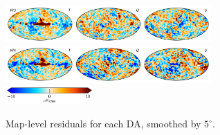\documentclass[twocolumn]{../../common/aa}
\newcommand{\BP}{\textsc{BeyondPlanck}}
\begin{document}
\begin{figure}
	\includegraphics[width=0.7\textwidth]{figures/compsep_res_W3_IQU.pdf}\\
	\includegraphics[width=0.7\textwidth]{figures/compsep_res_W4_IQU.pdf}\\
	\includegraphics[width=0.30\textwidth]{figures/cbar_10uK.pdf}
	\caption{Map-level residuals for each DA, smoothed by $5^\circ$.}
	\label{fig:compsep_residual}
\end{figure}



\end{document}
